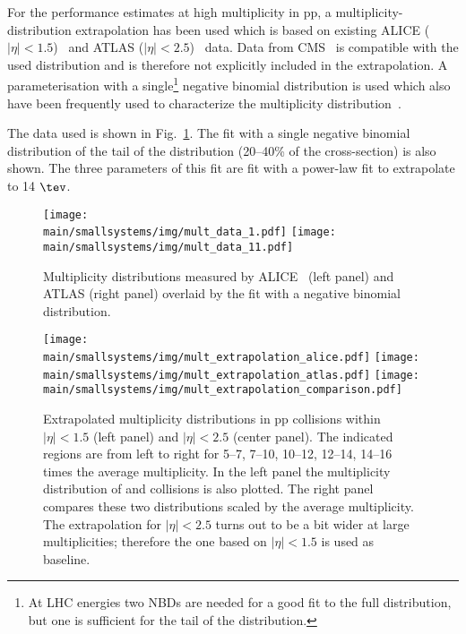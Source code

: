\documentclass[../report.tex]{subfiles}
\providecommand{\main}{..}
\begin{document}
For the performance estimates at high multiplicity in pp, a multiplicity-distribution extrapolation has been used which is based on existing ALICE ($|\eta| < 1.5$)~\cite{Adam:2015gka} and ATLAS ($|\eta|< 2.5$)~\cite{Aad:2010ac,Aad:2016xww} data. Data from CMS~\cite{Khachatryan:2010nk} is compatible with the used distribution and is therefore not explicitly included in the extrapolation. A parameterisation with a single\footnote{At LHC energies two NBDs are needed for a good fit to the full distribution, but one is sufficient for the tail of the distribution.} negative binomial distribution is used which also have been frequently used to characterize the multiplicity distribution~\cite{GrosseOetringhaus:2009kz,ALICE:2017pcy}.

The data used is shown in Fig.~\ref{fig:smallsystems_mult_data}. The fit with a single negative binomial distribution of the tail of the distribution (20--40\% of the cross-section) is also shown. The three parameters of this fit are fit with a power-law fit to extrapolate to 14 $\tev$.

\begin{figure}[ht]
\centering
\texttt{[image: \\main/smallsystems/img/mult\_data\_1.pdf]}
\hfill
\texttt{[image: \\main/smallsystems/img/mult\_data\_11.pdf]}
\caption{Multiplicity distributions measured by ALICE~\cite{Adam:2015gka} (left panel) and ATLAS\cite{Aad:2010ac,Aad:2016xww} (right panel) overlaid by the fit with a negative binomial distribution.}
\label{fig:smallsystems_mult_data}
\end{figure}

\begin{figure}[ht]
\centering
\texttt{[image: \\main/smallsystems/img/mult\_extrapolation\_alice.pdf]}
\texttt{[image: \\main/smallsystems/img/mult\_extrapolation\_atlas.pdf]}
\texttt{[image: \\main/smallsystems/img/mult\_extrapolation\_comparison.pdf]}
\caption{Extrapolated multiplicity distributions in pp collisions within $|\eta| < 1.5$ (left panel) and $|\eta| < 2.5$ (center panel). The indicated regions are from left to right for 5--7, 7--10, 10--12, 12--14, 14--16 times the average multiplicity. In the left panel the multiplicity distribution of \PbPb and \pPb collisions is also plotted. The right panel compares these two distributions scaled by the average multiplicity. The extrapolation for $|\eta| < 2.5$ turns out to be a bit wider at large multiplicities; therefore the one based on $|\eta| < 1.5$ is used as baseline.}
\label{fig:smallsystems_mult_extrapolation}
\end{figure}
\end{document}
